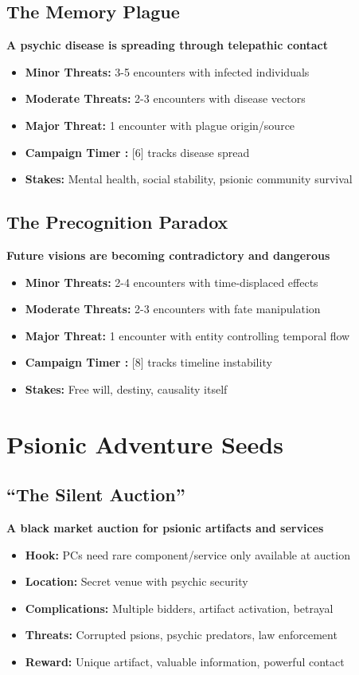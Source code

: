 \documentclass[11pt,twoside]{article}
\begin{document}
\subsection{The Memory Plague}
\textbf{A psychic disease is spreading through telepathic contact}
\begin{itemize}[leftmargin=*]
    \item \textbf{Minor Threats:} 3-5 encounters with infected individuals
    \item \textbf{Moderate Threats:} 2-3 encounters with disease vectors
    \item \textbf{Major Threat:} 1 encounter with plague origin/source
    \item \textbf{Campaign Timer :} [6] tracks disease spread
    \item \textbf{Stakes:} Mental health, social stability, psionic community survival
\end{itemize}

\subsection{The Precognition Paradox}
\textbf{Future visions are becoming contradictory and dangerous}
\begin{itemize}[leftmargin=*]
    \item \textbf{Minor Threats:} 2-4 encounters with time-displaced effects
    \item \textbf{Moderate Threats:} 2-3 encounters with fate manipulation
    \item \textbf{Major Threat:} 1 encounter with entity controlling temporal flow
    \item \textbf{Campaign Timer :} [8] tracks timeline instability
    \item \textbf{Stakes:} Free will, destiny, causality itself
\end{itemize}

\section{Psionic Adventure Seeds}

\subsection{``The Silent Auction''}
\textbf{A black market auction for psionic artifacts and services}
\begin{itemize}[leftmargin=*]
    \item \textbf{Hook:} PCs need rare component/service only available at auction
    \item \textbf{Location:} Secret venue with psychic security
    \item \textbf{Complications:} Multiple bidders, artifact activation, betrayal
    \item \textbf{Threats:} Corrupted psions, psychic predators, law enforcement
    \item \textbf{Reward:} Unique artifact, valuable information, powerful contact
\end{itemize}
\end{document}

